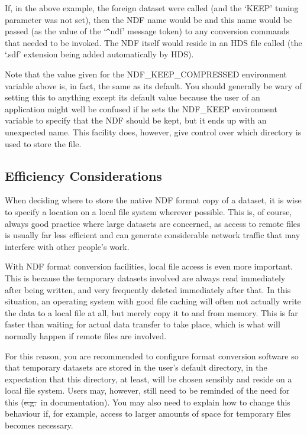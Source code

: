 If, in the above example, the foreign dataset were called
 (and the `KEEP' tuning parameter was
not set), then the NDF name would be  and this name
would be passed (as the value of the `\verb#^#ndf' message token) to
any conversion commands that needed to be invoked. The NDF itself
would reside in an HDS file called  (the `.sdf'
extension being added automatically by HDS).

Note that the value given for the NDF\_KEEP\_COMPRESSED environment
variable above is, in fact, the same as its default.  You should
generally be wary of setting this to anything except its default value
because the user of an application might well be confused if he sets
the NDF\_KEEP environment variable to specify that the NDF should be
kept, but it ends up with an unexpected name. This facility does,
however, give control over which directory is used to store the file.

\subsection{Efficiency Considerations}

When deciding where to store the native NDF format copy of a dataset,
it is wise to specify a location on a local file system wherever
possible. This is, of course, always good practice where large
datasets are concerned, as access to remote files is usually far less
efficient and can generate considerable network traffic that may
interfere with other people's work.

With NDF format conversion facilities, local file access is even more
important. This is because the temporary datasets involved are always
read immediately after being written, and very frequently deleted
immediately after that. In this situation, an operating system with
good file caching will often not actually write the data to a local
file at all, but merely copy it to and from memory. This is far faster
than waiting for actual data transfer to take place, which is what
will normally happen if remote files are involved.

For this reason, you are recommended to configure format conversion
software so that temporary datasets are stored in the user's default
directory, in the expectation that this directory, at least, will be
chosen sensibly and reside on a local file system. Users may, however,
still need to be reminded of the need for this (\st{e.g.}\ in
documentation). You may also need to explain how to change this
behaviour if, for example, access to larger amounts of space for
temporary files becomes necessary.

